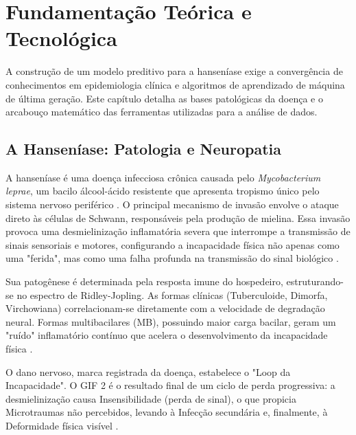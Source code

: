 \chapter{Fundamentação Teórica e Tecnológica} \label{chap2}

A construção de um modelo preditivo para a hanseníase exige a convergência de conhecimentos em epidemiologia clínica e algoritmos de aprendizado de máquina de última geração. Este capítulo detalha as bases patológicas da doença e o arcabouço matemático das ferramentas utilizadas para a análise de dados.

\section{A Hanseníase: Patologia e Neuropatia}

A hanseníase é uma doença infecciosa crônica causada pelo \textit{Mycobacterium leprae}, um bacilo álcool-ácido resistente que apresenta tropismo único pelo sistema nervoso periférico \cite{lepra_ref_pilar}. O principal mecanismo de invasão envolve o ataque direto às células de Schwann, responsáveis pela produção de mielina. Essa invasão provoca uma desmielinização inflamatória severa que interrompe a transmissão de sinais sensoriais e motores, configurando a incapacidade física não apenas como uma "ferida", mas como uma falha profunda na transmissão do sinal biológico \cite{britton2004leprosy, scollard2006continuing}.

Sua patogênese é determinada pela resposta imune do hospedeiro, estruturando-se no espectro de Ridley-Jopling. As formas clínicas (Tuberculoide, Dimorfa, Virchowiana) correlacionam-se diretamente com a velocidade de degradação neural. Formas multibacilares (MB), possuindo maior carga bacilar, geram um "ruído" inflamatório contínuo que acelera o desenvolvimento da incapacidade física \cite{britton2004leprosy, scollard2006continuing}.

O dano nervoso, marca registrada da doença, estabelece o "Loop da Incapacidade". O GIF 2 é o resultado final de um ciclo de perda progressiva: a desmielinização causa Insensibilidade (perda de sinal), o que propicia Microtraumas não percebidos, levando à Infecção secundária e, finalmente, à Deformidade física visível \cite{britton2004leprosy, scollard2006continuing}.

